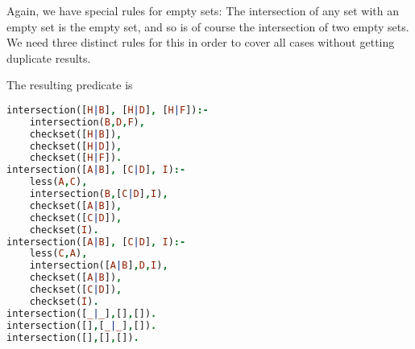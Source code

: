 \documentclass[a4paper]{article}
\begin{document}
\begin{description}
Again, we have special rules for empty sets: The intersection of any set with an empty set is the empty set, and so is of course the intersection of two empty sets. We need three distinct rules for this in order to cover all cases without getting duplicate results. 

The resulting predicate is 
\begin{lstlisting}[language=prolog]
intersection([H|B], [H|D], [H|F]):-
	intersection(B,D,F),
	checkset([H|B]),
	checkset([H|D]),
	checkset([H|F]).
intersection([A|B], [C|D], I):-
	less(A,C),
	intersection(B,[C|D],I),
	checkset([A|B]),
	checkset([C|D]),
	checkset(I).
intersection([A|B], [C|D], I):-
	less(C,A),
	intersection([A|B],D,I),
	checkset([A|B]),
	checkset([C|D]),
	checkset(I).
intersection([_|_],[],[]).
intersection([],[_|_],[]).
intersection([],[],[]).
\end{lstlisting}
\end{description}
\end{document}
